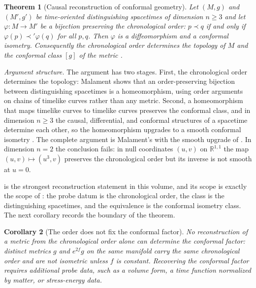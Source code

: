 \documentclass[11pt,letterpaper]{article}
\newtheorem{theorem}{Theorem}[section]
\newtheorem{corollary}[theorem]{Corollary}
\theoremstyle{definition}
\theoremstyle{remark}
\begin{document}
\begin{theorem}[Causal reconstruction of conformal geometry]\label{thm:malament}
Let $(M,g)$ and $(M',g')$ be time-oriented distinguishing spacetimes of dimension $n \ge 3$ and let $\varphi \colon M \to M'$ be a bijection preserving the chronological order: $p \prec q$ if and only if $\varphi(p) \prec' \varphi(q)$ for all $p, q$. Then $\varphi$ is a diffeomorphism and a conformal isometry. Consequently the chronological order determines the topology of $M$ and the conformal class $[g]$ of the metric \cite{malament,hkm}.
\end{theorem}

\par\medskip\noindent\emph{Argument structure.}
The argument has two stages. First, the chronological order determines the topology: Malament shows that an order-preserving bijection between distinguishing spacetimes is a homeomorphism, using order arguments on chains of timelike curves rather than any metric. Second, a homeomorphism that maps timelike curves to timelike curves preserves the conformal class, and in dimension $n \ge 3$ the causal, differential, and conformal structures of a spacetime determine each other, so the homeomorphism upgrades to a smooth conformal isometry \cite{hkm}. The complete argument is Malament's \cite{malament} with the smooth upgrade of \cite{hkm}. In dimension $n = 2$ the conclusion fails: in null coordinates $(u,v)$ on $\mathbb{R}^{1,1}$ the map $(u,v) \mapsto (u^3, v)$ preserves the chronological order but its inverse is not smooth at $u = 0$.
\par\medskip

 is the strongest reconstruction statement in this volume, and its scope is exactly the scope of : the probe datum is the chronological order, the class is the distinguishing spacetimes, and the equivalence is the conformal isometry class. The next corollary records the boundary of the theorem.

\begin{corollary}[The order does not fix the conformal factor]\label{cor:confactor}
No reconstruction of a metric from the chronological order alone can determine the conformal factor: distinct metrics $g$ and $e^{2f} g$ on the same manifold carry the same chronological order and are not isometric unless $f$ is constant. Recovering the conformal factor requires additional probe data, such as a volume form, a time function normalized by matter, or stress-energy data.
\end{corollary}
\end{document}
